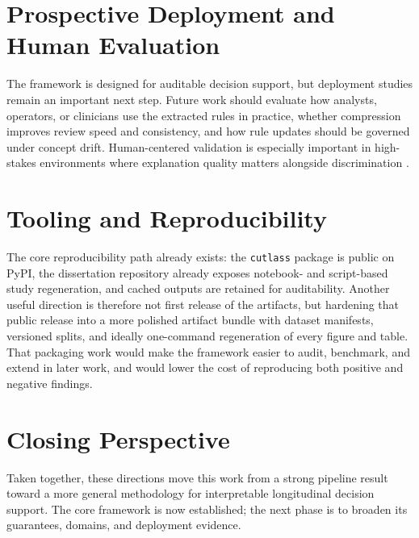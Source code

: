 \section{Prospective Deployment and Human Evaluation}

The framework is designed for auditable decision support, but deployment studies remain an important next step. Future work should evaluate how analysts, operators, or clinicians use the extracted rules in practice, whether compression improves review speed and consistency, and how rule updates should be governed under concept drift. Human-centered validation is especially important in high-stakes environments where explanation quality matters alongside discrimination \autocites{CRudin2019Stop,WJMurdoch2019Definitions}.

\section{Tooling and Reproducibility}

The core reproducibility path already exists: the \texttt{cutlass} package is public on PyPI, the dissertation repository already exposes notebook- and script-based study regeneration, and cached outputs are retained for auditability. Another useful direction is therefore not first release of the artifacts, but hardening that public release into a more polished artifact bundle with dataset manifests, versioned splits, and ideally one-command regeneration of every figure and table. That packaging work would make the framework easier to audit, benchmark, and extend in later work, and would lower the cost of reproducing both positive and negative findings.

\section{Closing Perspective}

Taken together, these directions move this work from a strong pipeline result toward a more general methodology for interpretable longitudinal decision support. The core framework is now established; the next phase is to broaden its guarantees, domains, and deployment evidence.

